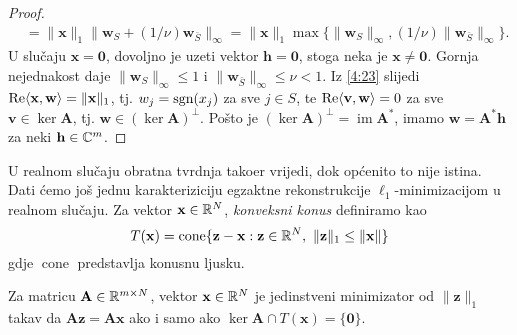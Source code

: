 \documentclass[a4paper,twoside,12pt]{memoir} %
\newcommand{\vect}[1]{\mathbf{#1}}
\renewcommand{\vec}{\vect}
\newcommand{\norm}[1]{\|{#1}\|}
\newcommand{\sgn}{\text{\normalfont{sgn}}}
\renewcommand{\Re}{\text{\normalfont{Re}}}
\DeclareMathOperator{\im}{im}
\DeclareMathOperator{\cone}{cone}
\begin{document}
\begin{proof}
\begin{align*}
        &= \norm{\vec x}_1 \norm{\vec w_S + (1/\nu)\vec w_{\bar S}}_{\infty} = \norm{\vec x}_1 \max\{ \norm{\vec w_S}_{\infty}, (1/\nu) \norm{\vec w_{\bar S}}_{\infty} \}.
    \end{align*}
    U slu\v{c}aju $\vec x = \vec 0$, dovoljno je uzeti vektor $\vec h = \vec 0$, stoga neka je $\vec x \neq \vec 0$. Gornja nejednakost daje $\norm{\vec w_S}_{\infty} \leq 1$ i $\norm{\vec w_{\bar S}}_{\infty} \leq \nu < 1$. Iz \eqref{4:23} slijedi $\Re \langle \vec x, \vec w\rangle = \norm{\vec x}_1$, tj. $w_j = \sgn(x_j)$ za sve $j \in S$, te $\Re \langle \vec v, \vec w \rangle = 0$ za sve $\vec v \in \ker \vec A$, tj. $\vec w \in (\ker \vec A)^{\perp}$. Po\v{s}to je $(\ker \vec A)^{\perp} = \im \vec A^*$, imamo $\vec w = \vec A^* \vec h$ za neki $\vec h \in \C^m$.
\end{proof}
U realnom slu\v{c}aju obratna tvrdnja tako\dj er vrijedi, dok op\'cenito to nije istina. Dati \'cemo jo\v{s} jednu karakteriziciju egzaktne rekonstrukcije $\ell_1$-minimizacijom u realnom slu\v{c}aju. Za vektor $\vec x \in \R^N$, \textit{konveksni konus} definiramo kao
\begin{equation}\label{4:34}
    T(\vec x) = \cone \{ \vec z - \vec x : \vec z \in \R^N,\ \norm{\vec z}_1 \leq \norm{\vec x}\} 
\end{equation}
gdje $\cone$ predstavlja konusnu ljusku.
\begin{thm}
    Za matricu $\vec A \in \R^{m \times N}$, vektor $\vec x \in \R^N$ je jedinstveni minimizator od $\norm{\vec z}_1$ takav da $\vec{Az} = \vec{Ax}$ ako i samo ako $\ker \vec A \cap T(\vec x) = \{\vec 0\}$.
\end{thm}
\end{document}
